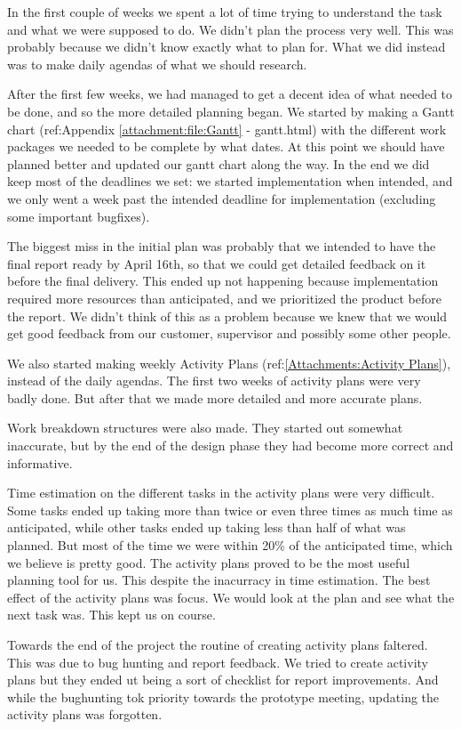 In the first couple of weeks we spent a lot of time trying to understand the task and what we were supposed to do. We didn't plan the process very well. This was probably because we didn't know exactly what to plan for. What we did instead was to make daily agendas of what we should research.

After the first few weeks, we had managed to get a decent idea of what needed to be done, and so the more detailed planning began. We started by making a Gantt chart (ref:Appendix \ref{attachment:file:Gantt} - gantt.html) with the different work packages we needed to be complete by what dates. At this point we should have planned better and updated our gantt chart along the way. In the end we did keep most of the deadlines we set: we started implementation when intended, and we only went a week past the intended deadline for implementation (excluding some important bugfixes). 

The biggest miss in the initial plan was probably that we intended to have the final report ready by April 16th, so that we could get detailed feedback on it before the final delivery. This ended up not happening because implementation required more resources than anticipated, and we prioritized the product before the report. We didn't think of this as a problem because we knew that we would get good feedback from our customer, supervisor and possibly some other people.

We also started making weekly Activity Plans (ref:\ref{Attachments:Activity Plans}), instead of the daily agendas. The first two weeks of activity plans were very badly done. But after that we made more detailed and more accurate plans.

Work breakdown structures were also made. They started out somewhat inaccurate, but by the end of the design phase they had become more correct and informative. 

Time estimation on the different tasks in the activity plans were very difficult. Some tasks ended up taking more than twice or even three times as much time as anticipated, while other tasks ended up taking less than half of what was planned. But most of the time we were within 20\% of the anticipated time, which we believe is pretty good. The activity plans proved to be the most useful planning tool for us. This despite the inacurracy in time estimation. The best effect of the activity plans was focus. We would look at the plan and see what the next task was. This kept us on course. 

Towards the end of the project the routine of creating activity plans faltered. This was due to bug hunting and report feedback. We tried to create activity plans but they ended ut being a sort of checklist for report improvements. And while the bughunting tok priority towards the prototype meeting, updating the activity plans was forgotten.
    
